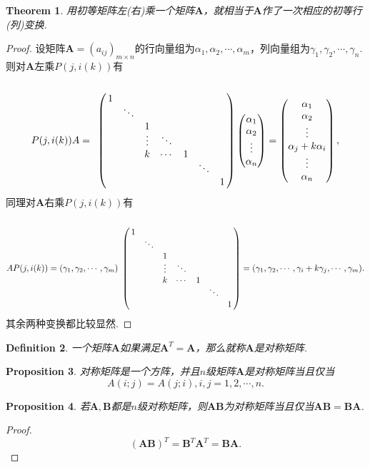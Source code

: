 \documentclass{article}
\newtheorem{theorem}{Theorem}[section]
\newtheorem{proposition}[theorem]{Proposition}
\newtheorem{definition}[theorem]{Definition}
\newcommand{\mbf}[1]{\bm{#1}}
\begin{document}
\begin{theorem}
\rm 用初等矩阵左(右)乘一个矩阵$\mbf{A}$，就相当于$\mbf{A}$作了一次相应的初等行(列)变换.
\end{theorem}

\begin{proof}
设矩阵$\mbf{A}=(a_{ij})_{m\times n}$的行向量组为$\alpha_1,\alpha_2,\cdots,\alpha_m$，列向量组为$\gamma_1,\gamma_2,\cdots,\gamma_n$. 则对$\mbf{A}$左乘$P(j,i(k))$有
$$
P(j,i(k))A = \bordermatrix{
		&\cr
		& 1 \cr
		& &\ddots	\cr
		& & & 1 \cr
		& & & \vdots & \ddots	\cr
		& & &  k& \cdots & 1	\cr
		& & & & & & \ddots	\cr
		& & & & & & & 1	\cr
		} \begin{pmatrix}\alpha_1 \\ \alpha_2 \\ \vdots \\ \alpha_n \end{pmatrix} = \begin{pmatrix}\alpha_1 \\ \alpha_2 \\ \vdots\\ \alpha_j + k\alpha_i \\ \vdots \\ \alpha_n \end{pmatrix},
$$
同理对$\mbf{A}$右乘$P(j,i(k))$有
$$
AP(j,i(k)) = (\gamma_1,\gamma_2,\cdots,\gamma_m) \bordermatrix{
		&\cr
		& 1 \cr
		& &\ddots	\cr
		& & & 1 \cr
		& & & \vdots & \ddots	\cr
		& & &  k& \cdots & 1	\cr
		& & & & & & \ddots	\cr
		& & & & & & & 1	\cr
		} = (\gamma_1,\gamma_2,\cdots,\gamma_{i} + k\gamma_{j},\cdots,\gamma_m).
$$
其余两种变换都比较显然.
\end{proof}

\begin{definition}
\rm 一个矩阵$\mbf{A}$如果满足$\mbf{A}^T = \mbf{A}$，那么就称$\mbf{A}$是对称矩阵. 
\end{definition}

\begin{proposition}
\rm 对称矩阵是一个方阵，并且$n$级矩阵$\mbf{A}$是对称矩阵当且仅当
$$
A(i;j) = A(j;i), i,j = 1,2,\cdots,n.
$$
\end{proposition}

\begin{proposition}
\rm 若$\mbf{A},\mbf{B}$都是$n$级对称矩阵，则$\mbf{A}\mbf{B}$为对称矩阵当且仅当$\mbf{A}\mbf{B} = \mbf{B}\mbf{A}$.
\end{proposition}

\begin{proof}
$$
(\mbf{A}\mbf{B})^T = \mbf{B}^T\mbf{A}^T = \mbf{B}\mbf{A}.
$$
\end{proof}
\end{document}

